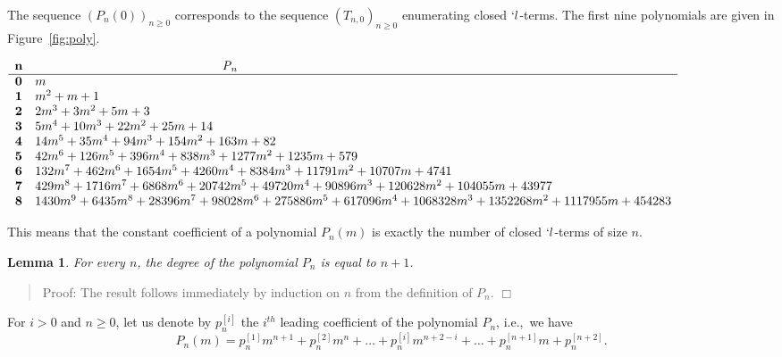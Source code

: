 \documentclass{jfp1}
\newenvironment{proof}[1]{\begin{quotation}\noindent\textsf{Proof:} #1}
{\(\Box\)\end{quotation}}
\newtheorem{lemma}[theo]{Lemma}
\newcommand{\ie}{i.e.,~}
\newcommand{\p}[2]{p^{[#1]}_{#2}}
\begin{document}
The sequence $\left( P_n(0) \right)_{n \geq 0}$ corresponds to the sequence $\left(
  T_{n,0} \right)_{n \geq 0}$ enumerating closed \mbox{$`l$-terms}.  The first nine
polynomials are given in Figure~\ref{fig:poly}.

\begin{figure*}
  \centering
  \begin{scriptsize}
  \begin{math}
    \begin{array}[c]{ c  l }
\mathbf{n} &\mathit{\hspace{150pt}P_n}\\
\hline
      \mathbf{0} & m \\
      \mathbf{1} & m^2 + m + 1\\
      \mathbf{2} & 2 m^3 + 3 m^2 + 5 m + 3\\
\mathbf{3} & 5 m^4 + 10 m^3 + 22 m^2 + 25 m + 14\\
\mathbf{4} & 14 m^5 + 35 m^4 + 94 m^3 + 154 m^2 + 163 m + 82\\
\mathbf{5} & 42 m^6 + 126 m^5 + 396 m^4 + 838 m^3 + 1277 m^2 + 1235 m + 579\\
\mathbf{6} & 132 m^7 + 462 m^6 + 1654 m^5 + 4260 m^4 + 8384 m^3 + 11791 m^2 + 10707 m
+ 4741\\
\mathbf{7} & 429 m^8 + 1716 m^7 + 6868 m^6 + 20742 m^5 + 49720 m^4 + 90896 m^3 +
120628 m^2 + 104055 m + 43977\\
\mathbf{8} & 1430 m^9 + 6435 m^8 + 28396 m^7 + 98028 m^6 + 275886 m^5 + 617096 m^4 +
1068328 m^3 + 1352268 m^2 + 1117955 m + 454283\\
\end{array}
  \end{math}
  \end{scriptsize}
  \caption{The first nine polynomials $P_n$}
  \label{fig:poly}
\end{figure*}

This means that the constant coefficient of a polynomial $P_n(m)$ is exactly the number of
closed $`l$-terms of size $n$.  

\begin{lemma}\label{lem:degree}
For every $n$, the degree of the polynomial $P_n$ is equal to $n+1$.
\end{lemma}

\begin{proof}
The result follows immediately by induction on $n$ from the definition of $P_n$.
\end{proof}

For $i>0$ and $n\geq 0$, let us denote by $\p{i}{n}$ the $i^{th}$ leading coefficient of the polynomial $P_n$, \ie we have
\[P_n(m) = \p{1}{n} m^{n+1} + \p{2}{n} m^n + \ldots + \p{i}{n} m^{n+2-i} + \ldots + \p{n+1}{n} m + \p{n+2}{n}.\]
\end{document}
